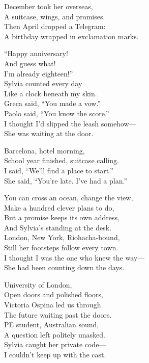 \begin{lyrics}
December took her overseas,\\
A suitcase, wings, and promises.\\
Then April dropped a Telegram:\\
A birthday wrapped in exclamation marks.

“Happy anniversary!\\
And guess what!\\
I’m already eighteen!”\\
Sylvia counted every day\\
Like a clock beneath my skin.\\
Greca said, “You made a vow.”\\
Paolo said, “You know the score.”\\
I thought I’d slipped the leash somehow—\\
She was waiting at the door.

Barcelona, hotel morning,\\
School year finished, suitcase calling.\\
I said, “We’ll find a place to start.”\\
She said, “You’re late. I’ve had a plan.”

You can cross an ocean, change the view,\\
Make a hundred clever plans to do,\\
But a promise keeps its own address,\\
And Sylvia’s standing at the desk.\\
London, New York, Riohacha-bound,\\
Still her footsteps follow every town.\\
I thought I was the one who knew the way—\\
She had been counting down the days.

University of London,\\
Open doors and polished floors,\\
Victoria Ospina led us through\\
The future waiting past the doors.\\
PE student, Australian sound,\\
A question left politely unasked.\\
Sylvia caught her private code—\\
I couldn’t keep up with the cast.


\end{lyrics}
